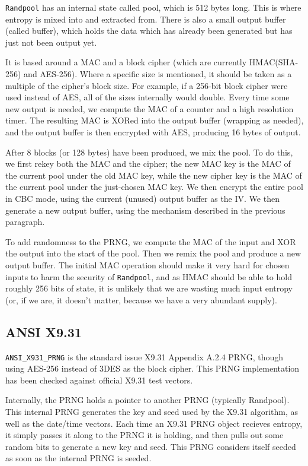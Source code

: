 \documentclass{article}
\newcommand{\type}[1]{\texttt{#1}}
\begin{document}
\type{Randpool} has an internal state called pool, which is 512 bytes
long. This is where entropy is mixed into and extracted from. There is also a
small output buffer (called buffer), which holds the data which has already
been generated but has just not been output yet.

It is based around a MAC and a block cipher (which are currently HMAC(SHA-256)
and AES-256). Where a specific size is mentioned, it should be taken as a
multiple of the cipher's block size. For example, if a 256-bit block cipher
were used instead of AES, all of the sizes internally would double. Every time
some new output is needed, we compute the MAC of a counter and a high
resolution timer. The resulting MAC is XORed into the output buffer (wrapping
as needed), and the output buffer is then encrypted with AES, producing 16
bytes of output.

After 8 blocks (or 128 bytes) have been produced, we mix the pool. To do this,
we first rekey both the MAC and the cipher; the new MAC key is the MAC of the
current pool under the old MAC key, while the new cipher key is the MAC of the
current pool under the just-chosen MAC key. We then encrypt the entire pool in
CBC mode, using the current (unused) output buffer as the IV. We then generate
a new output buffer, using the mechanism described in the previous paragraph.

To add randomness to the PRNG, we compute the MAC of the input and XOR the
output into the start of the pool. Then we remix the pool and produce a new
output buffer. The initial MAC operation should make it very hard for chosen
inputs to harm the security of \type{Randpool}, and as HMAC should be able to
hold roughly 256 bits of state, it is unlikely that we are wasting much input
entropy (or, if we are, it doesn't matter, because we have a very abundant
supply).

\subsection{ANSI X9.31}

\type{ANSI\_X931\_PRNG} is the standard issue X9.31 Appendix A.2.4 PRNG, though
using AES-256 instead of 3DES as the block cipher. This PRNG implementation has
been checked against official X9.31 test vectors.

Internally, the PRNG holds a pointer to another PRNG (typically
Randpool). This internal PRNG generates the key and seed used by the
X9.31 algorithm, as well as the date/time vectors. Each time an X9.31
PRNG object recieves entropy, it simply passes it along to the PRNG it
is holding, and then pulls out some random bits to generate a new key
and seed. This PRNG considers itself seeded as soon as the internal
PRNG is seeded.
\end{document}
